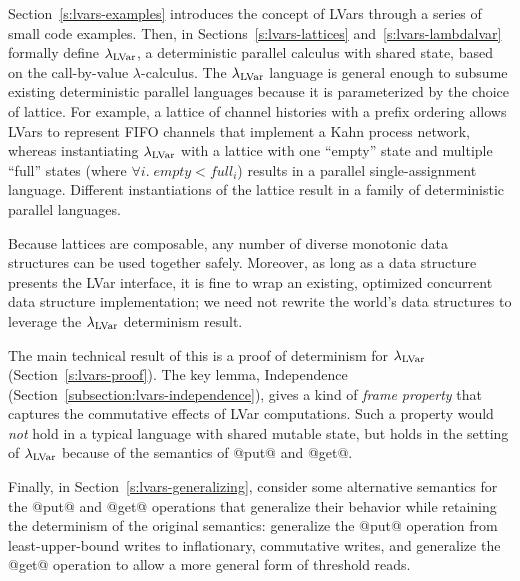 Section~\ref{s:lvars-examples} introduces the concept of LVars through
a series of small code examples.  Then, in Sections~\ref{s:lvars-lattices}
and~\ref{s:lvars-lambdalvar}  formally define $\lambda_{\textrm{LVar}}$, a
deterministic parallel calculus with shared state, based on the
call-by-value $\lambda$-calculus.  The $\lambda_{\textrm{LVar}}$ language is
general enough to subsume existing deterministic parallel languages
because it is parameterized by the choice of lattice.  For example, a
lattice of channel histories with a prefix ordering allows LVars to
represent FIFO channels that implement a Kahn process network, whereas
instantiating $\lambda_{\textrm{LVar}}$ with a lattice with one ``empty'' state
and multiple ``full'' states (where $\forall{i}.\; \mathit{empty}
< \mathit{full_i}$) results in a parallel single-assignment language.
Different instantiations of the lattice result in a family of
deterministic parallel languages.

Because lattices are composable, any number of diverse monotonic data
structures can be used together safely.  Moreover, as long as a data
structure presents the LVar interface, it is fine to wrap an existing,
optimized concurrent data structure implementation; we need not
rewrite the world's data structures to leverage the $\lambda_{\textrm{LVar}}$
determinism result.

The main technical result of this  is a proof of determinism
for $\lambda_{\textrm{LVar}}$ (Section~\ref{s:lvars-proof}).  The key lemma,
Independence (Section~\ref{subsection:lvars-independence}), gives a
kind of \emph{frame property} that captures the commutative effects of
LVar computations.  Such a property would \emph{not} hold in a typical
language with shared mutable state, but holds in the setting of
$\lambda_{\textrm{LVar}}$ because of the semantics of @put@ and @get@.

Finally, in Section~\ref{s:lvars-generalizing},  consider some
alternative semantics for the @put@ and @get@ operations that
generalize their behavior while retaining the determinism of the
original semantics:  generalize the @put@ operation from
least-upper-bound writes to inflationary, commutative writes, and 
generalize the @get@ operation to allow a more general form of
threshold reads.
\fi
